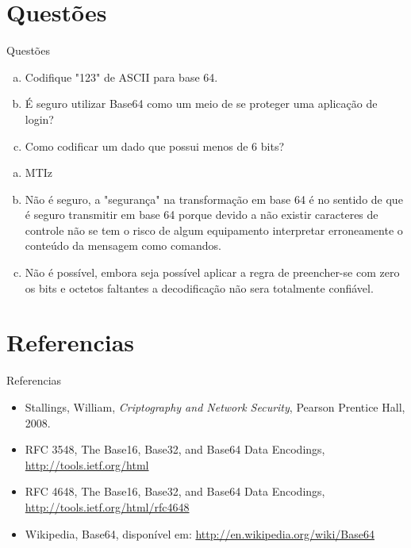 \documentclass[pdf]{beamer}
\begin{document}
\section{Questões}
\begin{frame}{Questões}
\transdissolve
\begin{enumerate}[(a)]
\item Codifique "123" de ASCII para base 64.
\item É seguro utilizar Base64 como um meio de se proteger uma aplicação de login?
\item Como codificar um dado que possui menos de 6 bits?
\end{enumerate}
\end{frame}
\begin{frame}
\begin{enumerate}[(a)]
\item MTIz
\item Não é seguro, a "segurança" na transformação em base 64 é no sentido de que é seguro transmitir em base 64 porque devido a não existir caracteres de controle não se tem o risco de algum equipamento interpretar erroneamente o conteúdo da mensagem como comandos.
\item Não é possível, embora seja possível aplicar a regra de preencher-se com zero os bits e octetos faltantes a decodificação não sera totalmente confiável.
\end{enumerate}
\end{frame}
\section{Referencias}
\begin{frame}{Referencias}
\begin{itemize}
\item Stallings, William, \emph{ Criptography and Network Security}, Pearson Prentice Hall, 2008.
\item RFC 3548, The Base16, Base32, and Base64 Data Encodings, \url{http://tools.ietf.org/html}
\item RFC 4648, The Base16, Base32, and Base64 Data Encodings, \url{http://tools.ietf.org/html/rfc4648}
\item Wikipedia, Base64, disponível em: \url{http://en.wikipedia.org/wiki/Base64}
\end{itemize}
\end{frame}
\end{document}
